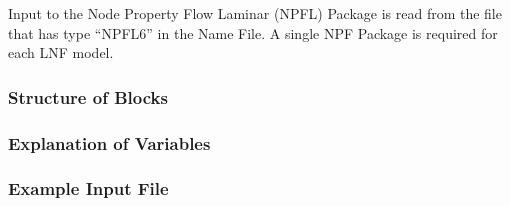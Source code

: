 Input to the Node Property Flow Laminar (NPFL) Package is read from the file that has type ``NPFL6'' in the Name File.  A single NPF Package is required for each LNF model. 

\vspace{5mm}
\subsubsection{Structure of Blocks}


\vspace{5mm}
\subsubsection{Explanation of Variables}
\begin{description}

\end{description}

\vspace{5mm}
\subsubsection{Example Input File}


